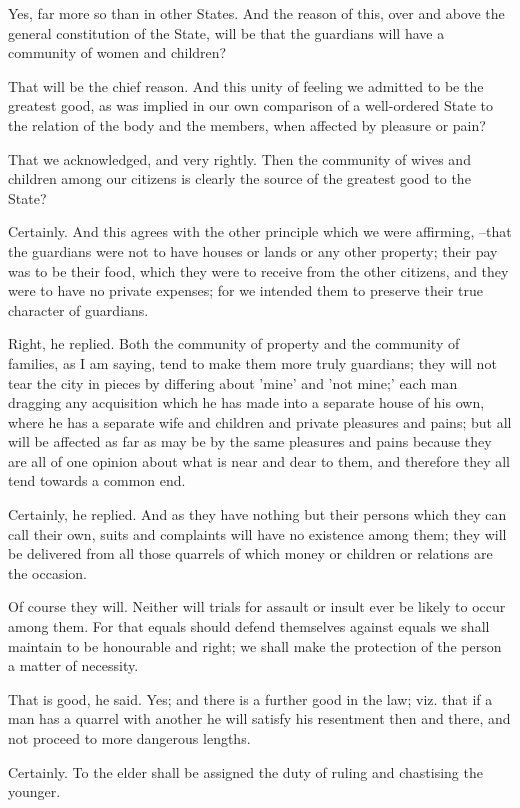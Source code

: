 Yes, far more so than in other States.
And the reason of this, over and above the general constitution of the State, will be that the guardians will have a community of women and children?

That will be the chief reason.
And this unity of feeling we admitted to be the greatest good, as was implied in our own comparison of a well-ordered State to the relation of the body and the members, when affected by pleasure or pain?

That we acknowledged, and very rightly.
Then the community of wives and children among our citizens is clearly the source of the greatest good to the State?

Certainly.
And this agrees with the other principle which we were affirming, --that the guardians were not to have houses or lands or any other property; their pay was to be their food, which they were to receive from the other citizens, and they were to have no private expenses; for we intended them to preserve their true character of guardians.

Right, he replied.
Both the community of property and the community of families, as I am saying, tend to make them more truly guardians; they will not tear the city in pieces by differing about 'mine' and 'not mine;' each man dragging any acquisition which he has made into a separate house of his own, where he has a separate wife and children and private pleasures and pains; but all will be affected as far as may be by the same pleasures and pains because they are all of one opinion about what is near and dear to them, and therefore they all tend towards a common end.

Certainly, he replied.
And as they have nothing but their persons which they can call their own, suits and complaints will have no existence among them; they will be delivered from all those quarrels of which money or children or relations are the occasion.

Of course they will.
Neither will trials for assault or insult ever be likely to occur among them. For that equals should defend themselves against equals we shall maintain to be honourable and right; we shall make the protection of the person a matter of necessity.

That is good, he said.
Yes; and there is a further good in the law; viz. that if a man has a quarrel with another he will satisfy his resentment then and there, and not proceed to more dangerous lengths.

Certainly.
To the elder shall be assigned the duty of ruling and chastising the younger.

